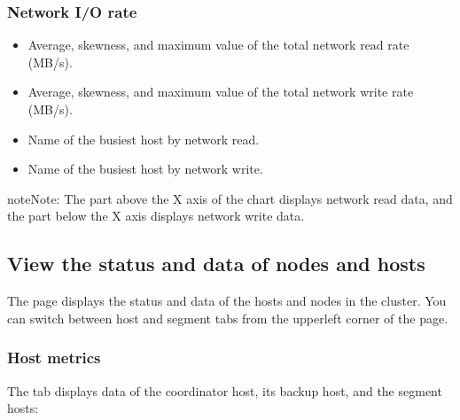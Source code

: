 \documentclass[letterpaper,10pt,english]{sphinxmanual}
\begin{document}
\subsubsection{Network I/O rate}
\label{\detokenize{manage-system/web-platform-monitoring/web-platform-view-cluster-status:network-i-o-rate}}\begin{itemize}
\item {} 
\sphinxAtStartPar
Average, skewness, and maximum value of the total network read rate (MB/s).

\item {} 
\sphinxAtStartPar
Average, skewness, and maximum value of the total network write rate (MB/s).

\item {} 
\sphinxAtStartPar
Name of the busiest host by network read.

\item {} 
\sphinxAtStartPar
Name of the busiest host by network write.

\end{itemize}

\begin{sphinxadmonition}{note}{Note:}
\sphinxAtStartPar
The part above the X axis of the chart displays network read data, and the part below the X axis displays network write data.
\end{sphinxadmonition}


\subsection{View the status and data of nodes and hosts}
\label{\detokenize{manage-system/web-platform-monitoring/web-platform-view-cluster-status:view-the-status-and-data-of-nodes-and-hosts}}
\sphinxAtStartPar
The  page displays the status and data of the hosts and nodes in the cluster. You can switch between host and segment tabs from the upper\sphinxhyphen{}left corner of the page.

\noindent{}


\subsubsection{Host metrics}
\label{\detokenize{manage-system/web-platform-monitoring/web-platform-view-cluster-status:host-metrics}}
\sphinxAtStartPar
The  tab displays data of the coordinator host, its backup host, and the segment hosts:
\end{document}
